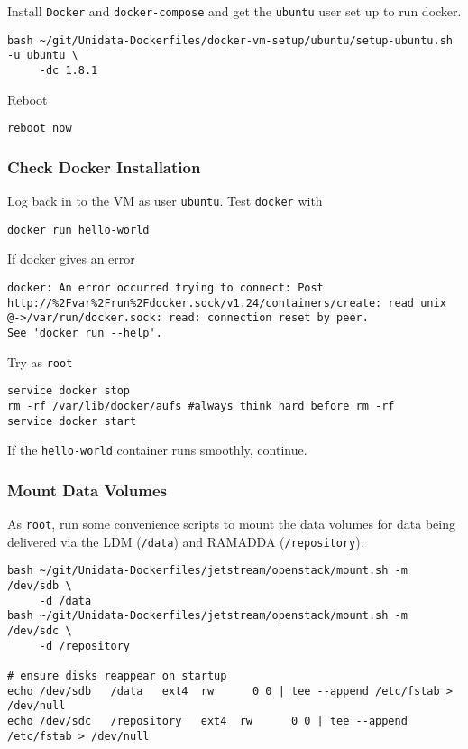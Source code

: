 \documentclass[onecolumn,9pt]{article}
\begin{document}
Install \texttt{Docker} and \texttt{docker-compose} and get the \texttt{ubuntu} user set up to run docker.

\begin{verbatim}
bash ~/git/Unidata-Dockerfiles/docker-vm-setup/ubuntu/setup-ubuntu.sh -u ubuntu \
     -dc 1.8.1
\end{verbatim}

Reboot

\begin{verbatim}
reboot now
\end{verbatim}

\subsubsection{Check Docker Installation}
\label{sec:orgheadline17}

Log back in to the VM as user \texttt{ubuntu}. Test \texttt{docker} with

\begin{verbatim}
docker run hello-world
\end{verbatim}

If docker gives an error

\begin{verbatim}
docker: An error occurred trying to connect: Post http://%2Fvar%2Frun%2Fdocker.sock/v1.24/containers/create: read unix @->/var/run/docker.sock: read: connection reset by peer.
See 'docker run --help'.
\end{verbatim}

Try as \texttt{root}

\begin{verbatim}
service docker stop
rm -rf /var/lib/docker/aufs #always think hard before rm -rf
service docker start
\end{verbatim}

If the \texttt{hello-world} container runs smoothly, continue.

\subsubsection{Mount Data Volumes}
\label{sec:orgheadline18}

As \texttt{root}, run some convenience scripts to mount the data volumes for data being delivered via the LDM (\texttt{/data}) and RAMADDA (\texttt{/repository}).

\begin{verbatim}
bash ~/git/Unidata-Dockerfiles/jetstream/openstack/mount.sh -m /dev/sdb \
     -d /data
bash ~/git/Unidata-Dockerfiles/jetstream/openstack/mount.sh -m /dev/sdc \
     -d /repository

# ensure disks reappear on startup
echo /dev/sdb   /data   ext4  rw      0 0 | tee --append /etc/fstab > /dev/null
echo /dev/sdc   /repository   ext4  rw      0 0 | tee --append /etc/fstab > /dev/null
\end{verbatim}
\end{document}
